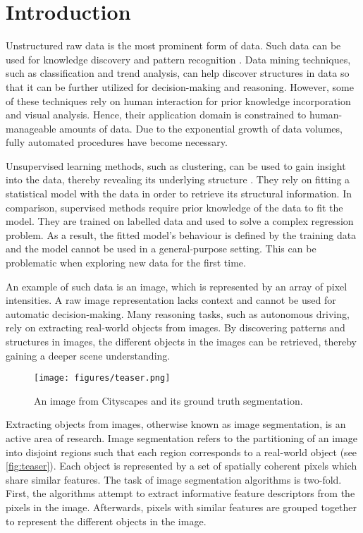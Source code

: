 
\chapter{Introduction}\label{chapter:introduction}

Unstructured raw data is the most prominent form of data. Such data can be used for knowledge discovery and pattern recognition \parencite{fu1997data}. Data mining techniques, such as classification and trend analysis, can help discover structures in data so that it can be further utilized for decision-making and reasoning. However, some of these techniques rely on human interaction for prior knowledge incorporation and visual analysis. Hence, their application domain is constrained to human-manageable amounts of data. Due to the exponential growth of data volumes, fully automated procedures have become necessary.

Unsupervised learning methods, such as clustering, can be used to gain insight into the data, thereby revealing its underlying structure \parencite{jain2010data}. They rely on fitting a statistical model with the data in order to retrieve its structural information. In comparison, supervised methods require prior knowledge of the data to fit the model. They are trained on labelled data and used to solve a complex regression problem. As a result, the fitted model's behaviour is defined by the training data and the model cannot be used in a general-purpose setting. This can be problematic when exploring new data for the first time.

An example of such data is an image, which is represented by an array of pixel intensities. A raw image representation lacks context and cannot be used for automatic decision-making. Many reasoning tasks, such as autonomous driving, rely on extracting real-world objects from images. By discovering patterns and structures in images, the different objects in the images can be retrieved, thereby gaining a deeper scene understanding.

\begin{figure}[htb]
    \centering
    \texttt{[image: figures/teaser.png]}
    \caption{An image from Cityscapes \parencite{cityscapes} and its ground truth segmentation.}
    \label{fig:teaser}
\end{figure}

Extracting objects from images, otherwise known as image segmentation, is an active area of research. Image segmentation refers to the partitioning of an image into disjoint regions such that each region corresponds to a real-world object (see \autoref{fig:teaser}). Each object is represented by a set of spatially coherent pixels which share similar features. The task of image segmentation algorithms is two-fold. First, the algorithms attempt to extract informative feature descriptors from the pixels in the image. Afterwards, pixels with similar features are grouped together to represent the different objects in the image. 

